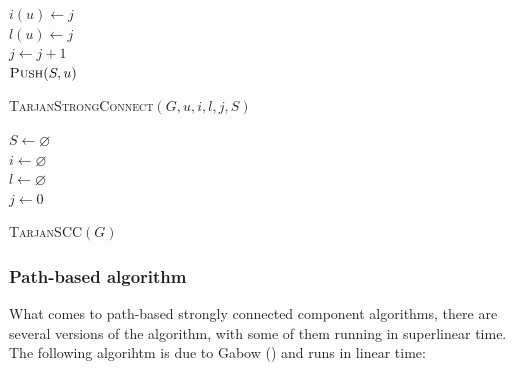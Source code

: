 \documentclass[english]{tktltiki2}
\theoremstyle{definition}
\theoremstyle{remark}
\begin{document}
\begin{algorithm}[H]
$i(u) \leftarrow j$ \\
$l(u) \leftarrow j$ \\
$j \leftarrow j + 1$ \\
$\textsc{Push}(S, u)$ \\
\caption{\textsc{TarjanStrongConnect}$(G, u, i, l, j, S)$}
\label{alg:tarjan_strong_connect}
\end{algorithm}

\begin{algorithm}[H]
$S \leftarrow \varnothing$ \\
$i \leftarrow \varnothing$ \\
$l \leftarrow \varnothing$ \\
$j \leftarrow 0$ \\
\caption{\textsc{TarjanSCC}$(G)$}
\label{alg:tarjan}
\end{algorithm}

\subsubsection{Path-based algorithm}
What comes to path-based strongly connected component algorithms, there are several versions of the algorithm, with some of them running in superlinear time. The following algorihtm is due to Gabow (\cite{Gabow2000}) and runs in linear time:
\end{document}
